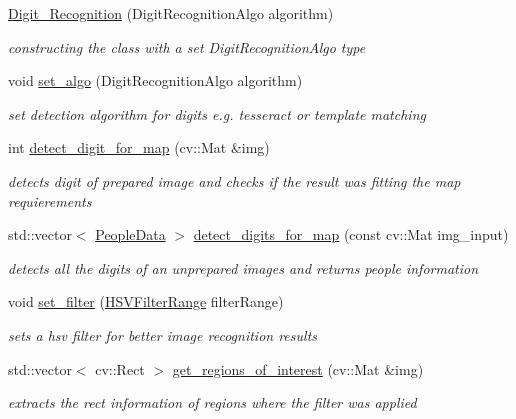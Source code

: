 \begin{DoxyCompactItemize}
\item 
\mbox{\hyperlink{class_digit___recognition_a183d686f4f9f3ce1ed555e9311d30f56}{Digit\+\_\+\+Recognition}} (Digit\+Recognition\+Algo algorithm)
\begin{DoxyCompactList}\small\item\em constructing the class with a set Digit\+Recognition\+Algo type \end{DoxyCompactList}\item 
\mbox{\label{class_digit___recognition_a5c83d879c6881693c3606cc5a1bc8ef2}} 
void \mbox{\hyperlink{class_digit___recognition_a5c83d879c6881693c3606cc5a1bc8ef2}{set\+\_\+algo}} (Digit\+Recognition\+Algo algorithm)
\begin{DoxyCompactList}\small\item\em set detection algorithm for digits e.\+g. tesseract or template matching \end{DoxyCompactList}\item 
\mbox{\label{class_digit___recognition_a479e6126291463d9117abc6553c555df}} 
int \mbox{\hyperlink{class_digit___recognition_a479e6126291463d9117abc6553c555df}{detect\+\_\+digit\+\_\+for\+\_\+map}} (cv\+::\+Mat \&img)
\begin{DoxyCompactList}\small\item\em detects digit of prepared image and checks if the result was fitting the map requierements \end{DoxyCompactList}\item 
\mbox{\label{class_digit___recognition_aad1207aa02e043af5505c217ef1996b9}} 
std\+::vector$<$ \mbox{\hyperlink{struct_people_data}{People\+Data}} $>$ \mbox{\hyperlink{class_digit___recognition_aad1207aa02e043af5505c217ef1996b9}{detect\+\_\+digits\+\_\+for\+\_\+map}} (const cv\+::\+Mat img\+\_\+input)
\begin{DoxyCompactList}\small\item\em detects all the digits of an unprepared images and returns people information \end{DoxyCompactList}\item 
void \mbox{\hyperlink{class_digit___recognition_a68484f6730ee2f0fc2050726c3ff2252}{set\+\_\+filter}} (\mbox{\hyperlink{struct_h_s_v_filter_range}{H\+S\+V\+Filter\+Range}} filter\+Range)
\begin{DoxyCompactList}\small\item\em sets a hsv filter for better image recognition results \end{DoxyCompactList}\item 
std\+::vector$<$ cv\+::\+Rect $>$ \mbox{\hyperlink{class_digit___recognition_acb87e2fb3a72d625170ab8c95ef6828f}{get\+\_\+regions\+\_\+of\+\_\+interest}} (cv\+::\+Mat \&img)
\begin{DoxyCompactList}\small\item\em extracts the rect information of regions where the filter was applied \end{DoxyCompactList}\end{DoxyCompactItemize}
